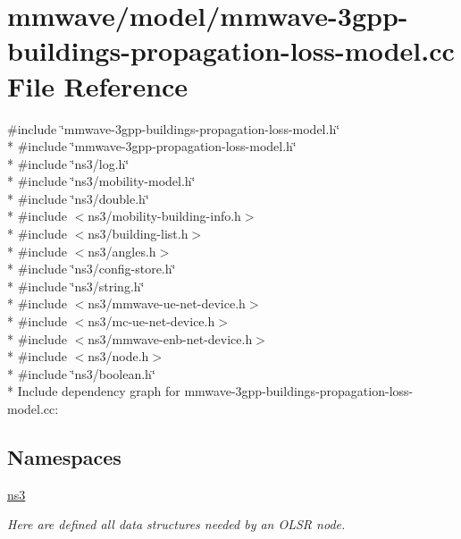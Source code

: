 \hypertarget{mmwave-3gpp-buildings-propagation-loss-model_8cc}{}\section{mmwave/model/mmwave-\/3gpp-\/buildings-\/propagation-\/loss-\/model.cc File Reference}
\label{mmwave-3gpp-buildings-propagation-loss-model_8cc}
{\ttfamily \#include \char`\"{}mmwave-\/3gpp-\/buildings-\/propagation-\/loss-\/model.\+h\char`\"{}}\\*
{\ttfamily \#include \char`\"{}mmwave-\/3gpp-\/propagation-\/loss-\/model.\+h\char`\"{}}\\*
{\ttfamily \#include \char`\"{}ns3/log.\+h\char`\"{}}\\*
{\ttfamily \#include \char`\"{}ns3/mobility-\/model.\+h\char`\"{}}\\*
{\ttfamily \#include \char`\"{}ns3/double.\+h\char`\"{}}\\*
{\ttfamily \#include $<$ns3/mobility-\/building-\/info.\+h$>$}\\*
{\ttfamily \#include $<$ns3/building-\/list.\+h$>$}\\*
{\ttfamily \#include $<$ns3/angles.\+h$>$}\\*
{\ttfamily \#include \char`\"{}ns3/config-\/store.\+h\char`\"{}}\\*
{\ttfamily \#include \char`\"{}ns3/string.\+h\char`\"{}}\\*
{\ttfamily \#include $<$ns3/mmwave-\/ue-\/net-\/device.\+h$>$}\\*
{\ttfamily \#include $<$ns3/mc-\/ue-\/net-\/device.\+h$>$}\\*
{\ttfamily \#include $<$ns3/mmwave-\/enb-\/net-\/device.\+h$>$}\\*
{\ttfamily \#include $<$ns3/node.\+h$>$}\\*
{\ttfamily \#include \char`\"{}ns3/boolean.\+h\char`\"{}}\\*
Include dependency graph for mmwave-\/3gpp-\/buildings-\/propagation-\/loss-\/model.cc\+:
\subsection*{Namespaces}
\begin{DoxyCompactItemize}
\item 
 \hyperlink{namespacens3}{ns3}
\begin{DoxyCompactList}\small\item\em Here are defined all data structures needed by an O\+L\+SR node. \end{DoxyCompactList}\end{DoxyCompactItemize}
